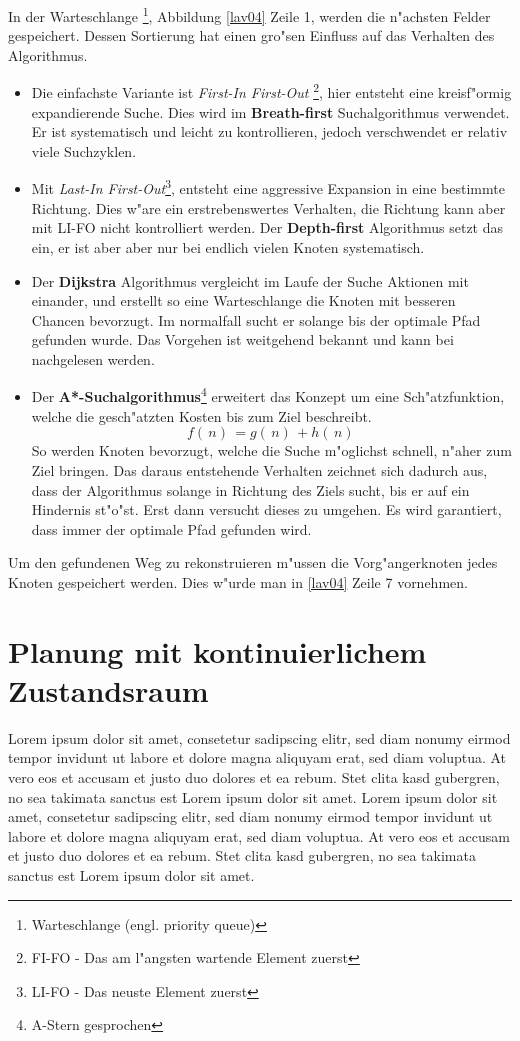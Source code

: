 In der Warteschlange \footnote{Warteschlange (engl. priority queue)}, Abbildung \ref{lav04} Zeile 1, werden die n"achsten Felder gespeichert. Dessen Sortierung hat einen gro"sen Einfluss auf das Verhalten des Algorithmus. 
	\begin{itemize}
		\item Die einfachste Variante ist \textit{First-In First-Out} \footnote{FI-FO - Das am l"angsten wartende Element zuerst}, hier entsteht eine kreisf"ormig expandierende Suche. Dies wird im \textbf{Breath-first} Suchalgorithmus verwendet. Er ist systematisch und leicht zu kontrollieren, jedoch verschwendet er relativ viele Suchzyklen.\cite[~S. 35]{Lav06}
		\item Mit \textit{Last-In First-Out}\footnote{LI-FO - Das neuste Element zuerst}, entsteht eine aggressive Expansion in eine bestimmte Richtung. 
		Dies w"are ein erstrebenswertes Verhalten, die Richtung kann aber mit LI-FO nicht kontrolliert werden. Der \textbf{Depth-first} Algorithmus setzt das ein, er ist aber aber nur bei endlich vielen Knoten systematisch. \cite[~S. 36]{Lav06}
		\item Der \textbf{Dijkstra} Algorithmus vergleicht im Laufe der Suche Aktionen mit einander, und erstellt so eine Warteschlange die Knoten mit besseren Chancen bevorzugt. Im normalfall sucht er solange bis der optimale Pfad gefunden wurde. Das Vorgehen ist weitgehend bekannt und kann bei \cite[~S. 36]{Lav06} nachgelesen werden.
		\item Der \textbf{A*-Suchalgorithmus}\footnote{A-Stern gesprochen} erweitert das Konzept um eine Sch"atzfunktion, welche die gesch"atzten Kosten bis zum Ziel beschreibt.
		$$f( \, n ) \, = g ( \, n ) \, + h ( \, n ) \,$$
		So werden Knoten bevorzugt, welche die Suche m"oglichst schnell, n"aher zum Ziel bringen. Das daraus entstehende Verhalten zeichnet sich dadurch aus, dass der Algorithmus solange in Richtung des Ziels sucht, bis er auf ein Hindernis st"o"st. Erst dann versucht dieses zu umgehen. Es wird garantiert, dass immer der optimale Pfad gefunden wird.\cite[~S. 37]{Lav06}
	\end{itemize}
Um den gefundenen Weg zu rekonstruieren m"ussen die Vorg"angerknoten jedes Knoten gespeichert werden. Dies w"urde man in \ref{lav04} Zeile 7 vornehmen. 


\section{Planung mit kontinuierlichem Zustandsraum} \label{konti}
Lorem ipsum dolor sit amet, consetetur sadipscing elitr, sed diam nonumy eirmod tempor invidunt ut labore et dolore magna aliquyam erat, sed diam voluptua. At vero eos et accusam et justo duo dolores et ea rebum. Stet clita kasd gubergren, no sea takimata sanctus est Lorem ipsum dolor sit amet. Lorem ipsum dolor sit amet, consetetur sadipscing elitr, sed diam nonumy eirmod tempor invidunt ut labore et dolore magna aliquyam erat, sed diam voluptua. At vero eos et accusam et justo duo dolores et ea rebum. Stet clita kasd gubergren, no sea takimata sanctus est Lorem ipsum dolor sit amet.

